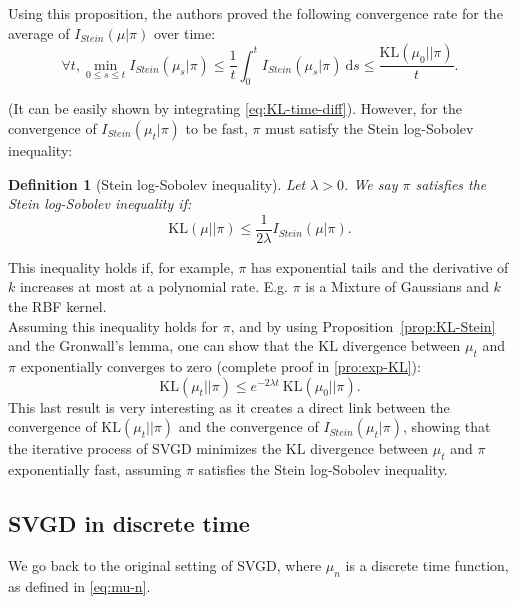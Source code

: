 \documentclass{article}
\newcommand{\KL}{\mathrm{KL}}
\renewcommand{\d}{\: \mathrm{d}}
\newcommand{\Stein}{I_{Stein}(\mu | \pi)}
\newtheorem{definition}{Definition}
\begin{document}
Using this proposition, the authors proved the following convergence rate
for the average of $\Stein$ over time:
\begin{equation}
  \forall t, \min_{0 \leq s \leq t} I_{Stein}(\mu_s | \pi)
    \leq \frac{1}{t} \int_0^t I_{Stein}(\mu_s | \pi) \d s
    \leq \frac{\KL(\mu_0 || \pi)}{t}.
  \label{eq:convergence-avg-stein}
\end{equation}

(It can be easily shown by integrating \eqref{eq:KL-time-diff}).
However, for the convergence of $I_{Stein}(\mu_t | \pi)$ to be fast,
$\pi$ must satisfy the Stein log-Sobolev inequality:

\begin{definition}[Stein log-Sobolev inequality]\label{def:stein-log-Sobolev}
  Let $\lambda > 0$. We say $\pi$ satisfies the Stein log-Sobolev inequality if:
  $$
  \KL(\mu || \pi) \leq \frac{1}{2 \lambda} \Stein.
  $$
\end{definition}
\noindent
This inequality holds if, for example, $\pi$ has exponential tails and the derivative of $k$
increases at most at a polynomial rate. E.g. $\pi$ is a Mixture of Gaussians
and $k$ the RBF kernel.\\
Assuming this inequality holds for $\pi$, and by using Proposition~\ref{prop:KL-Stein}
and the Gronwall's lemma,
one can show that the $\KL$ divergence between $\mu_t$ and $\pi$ exponentially
converges to zero (complete proof in \ref{pro:exp-KL}):
\begin{equation}
  \KL(\mu_t || \pi) \leq e^{-2 \lambda t} \: \KL(\mu_0 || \pi).
  \label{eq:exp-KL}
\end{equation}
This last result is very interesting as it creates a direct link between the
convergence of $\KL(\mu_t || \pi)$ and the convergence
of $I_{Stein}(\mu_t | \pi)$, showing that the iterative process
of SVGD minimizes the $\KL$ divergence between $\mu_t$ and $\pi$ exponentially fast,
assuming $\pi$ satisfies the Stein log-Sobolev inequality.

\subsection{SVGD in discrete time}
We go back to the original setting of SVGD, where $\mu_n$ is a discrete
time function, as defined in \eqref{eq:mu-n}.\\
\end{document}
